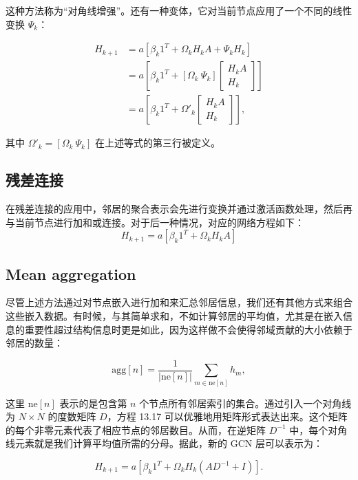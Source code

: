 这种方法称为“对角线增强”。还有一种变体，它对当前节点应用了一个不同的线性变换 \(\Psi_k\)：


\begin{align}
H_{k+1} &= a \left[ \beta_{k} 1^T + \Omega_k H_k A + \Psi_k H_k \right] \\
&= a \left[ \beta_{k} 1^T + \left[ \Omega_k \ \Psi_k \right] \begin{bmatrix} H_k A \\ H_k \end{bmatrix} \right] \\
&= a \left[ \beta_{k} 1^T + \Omega'_k \begin{bmatrix} H_k A \\ H_k \end{bmatrix} \right], 
\end{align} 


其中 \(\Omega'_k = \left[ \Omega_k \ \Psi_k \right]\) 在上述等式的第三行被定义。

\subsection{残差连接}
在残差连接的应用中，邻居的聚合表示会先进行变换并通过激活函数处理，然后再与当前节点进行加和或连接。对于后一种情况，对应的网络方程如下：
\begin{equation}
H_{k+1} = a \left[ \beta_k 1^T + \Omega_k H_k A \right] 
\end{equation}
\subsection{Mean aggregation}
尽管上述方法通过对节点嵌入进行加和来汇总邻居信息，我们还有其他方式来组合这些嵌入数据。有时候，与其简单求和，不如计算邻居的平均值，尤其是在嵌入信息的重要性超过结构信息时更是如此，因为这样做不会使得邻域贡献的大小依赖于邻居的数量：

\begin{equation}
\text{agg}[n] = \frac{1}{|\text{ne}[n]|} \sum_{m \in \text{ne}[n]} h_m, 
\end{equation}

这里 \(\text{ne}[n]\) 表示的是包含第 \(n\) 个节点所有邻居索引的集合。通过引入一个对角线为 \(N \times N\) 的度数矩阵 \(D\)，方程 13.17 可以优雅地用矩阵形式表达出来。这个矩阵的每个非零元素代表了相应节点的邻居数目。从而，在逆矩阵 \(D^{-1}\) 中，每个对角线元素就是我们计算平均值所需的分母。据此，新的 GCN 层可以表示为：

\begin{equation}
H_{k+1} = a \left[ \beta_k 1^T + \Omega_k H_k (AD^{-1} + I) \right]. 
\end{equation}

